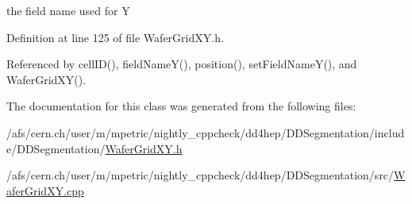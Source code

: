 the field name used for Y 

Definition at line 125 of file WaferGridXY.h.

Referenced by cellID(), fieldNameY(), position(), setFieldNameY(), and WaferGridXY().

The documentation for this class was generated from the following files:\begin{DoxyCompactItemize}
\item 
/afs/cern.ch/user/m/mpetric/nightly\_\-cppcheck/dd4hep/DDSegmentation/include/DDSegmentation/\hyperlink{_d_d_segmentation_2include_2_d_d_segmentation_2_wafer_grid_x_y_8h}{WaferGridXY.h}\item 
/afs/cern.ch/user/m/mpetric/nightly\_\-cppcheck/dd4hep/DDSegmentation/src/\hyperlink{_d_d_segmentation_2src_2_wafer_grid_x_y_8cpp}{WaferGridXY.cpp}\end{DoxyCompactItemize}
